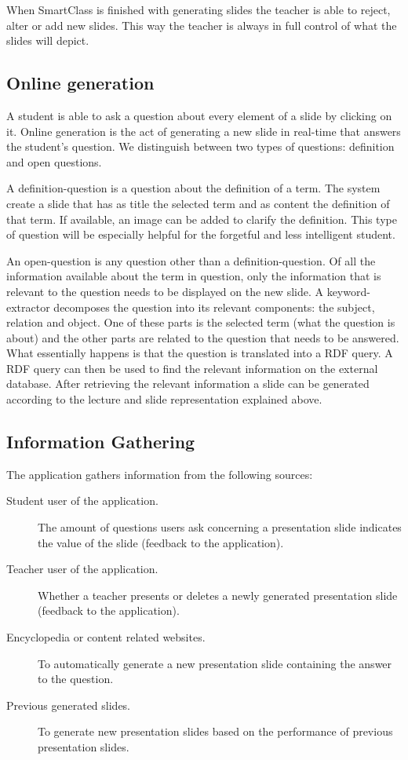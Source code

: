 \documentclass[11pt]{article}
\begin{document}
When SmartClass is finished with generating slides the teacher is able to reject, alter or add new slides. This way the teacher is always in full control of what the slides will depict. 

\subsection{Online generation}
A student is able to ask a question about every element of a slide by clicking on it. Online generation is the act of generating a new slide in real-time that answers the student's question. We distinguish between two types of questions: definition and open questions. 

A definition-question is a question about the definition of a term. The system create a slide that has as title the selected term and as content the definition of that term. If available, an image can be added to clarify the definition. This type of question will be especially helpful for the forgetful and less intelligent student. 

An open-question is any question other than a definition-question. Of all the information available about the term in question, only the information that is relevant to the question needs to be displayed on the new slide. A keyword-extractor decomposes the question into its relevant components: the subject, relation and object. One of these parts is the selected term (what the question is about) and the other parts are related to the question that needs to be answered. What essentially happens is that the question is translated into a RDF query. A RDF query can then be used to find the relevant information on the external database. After retrieving the relevant information a slide can be generated according to the lecture and slide representation explained above.

\subsection{Information Gathering}
The application gathers information from the following sources:
\begin{description}
\item[Student user of the application.] The amount of questions users ask concerning a presentation slide indicates the value of the slide (feedback to the application).
\item[Teacher user of the application.] Whether a teacher presents or deletes a newly generated presentation slide (feedback to the application).
\item[Encyclopedia or content related websites.] To automatically generate a new presentation slide containing the answer to the question.
\item[Previous generated slides.] To generate new presentation slides based on the performance of previous presentation slides.
\end{description}
\end{document}
